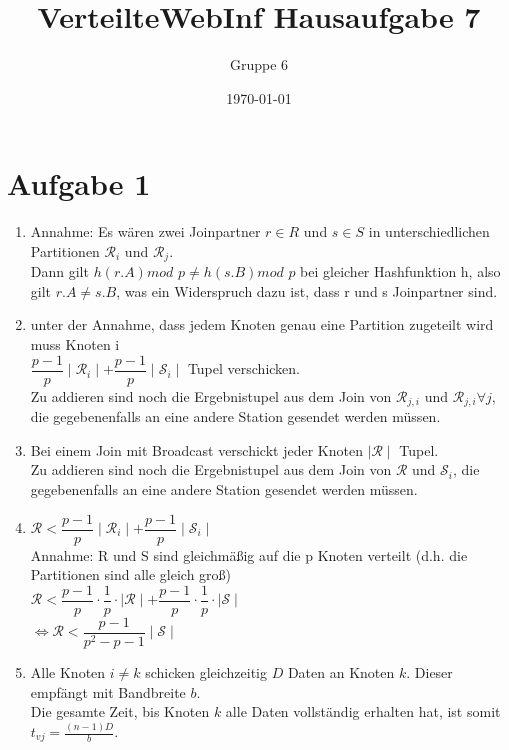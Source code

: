 \documentclass[a4paper]{article}
\author{Gruppe 6}
\title{\textbf{VerteilteWebInf Hausaufgabe 7}}
\date{\today}
\begin{document}
\maketitle


\section*{Aufgabe 1}
\begin{enumerate}[label=\alph*)]
\item Annahme: Es wären zwei Joinpartner $ r \in R $ und $ s \in S $ in unterschiedlichen Partitionen $ \mathcal{R}_i $ und $ \mathcal{R}_j $.\\
Dann gilt $ h(r.A) mod $  $p \neq h(s.B) mod $  $ p $ bei gleicher Hashfunktion h, also gilt $ r.A \neq s.B $, was ein Widerspruch dazu ist, dass r und s Joinpartner sind. 
\item unter der Annahme, dass jedem Knoten genau eine Partition zugeteilt wird muss Knoten i \\
$ \dfrac{p-1}{p} \mid \mathcal{R}_i \mid + \dfrac{p-1}{p} \mid \mathcal{S}_i \mid $ Tupel verschicken.\\
Zu addieren sind noch die Ergebnistupel aus dem Join von $ \mathcal{R}_{j,i} $ und $ \mathcal{R}_{j,i} \forall j$, die gegebenenfalls an eine andere Station gesendet werden müssen.
\item Bei einem Join mit Broadcast verschickt jeder Knoten $ \mid \mathcal{R} \mid $ Tupel.\\
Zu addieren sind noch die Ergebnistupel aus dem Join von $ \mathcal{R} $ und $ \mathcal{S}_{i} $, die gegebenenfalls an eine andere Station gesendet werden müssen.
\item $ \mathcal{R} < \dfrac{p-1}{p} \mid \mathcal{R}_i \mid + \dfrac{p-1}{p} \mid \mathcal{S}_i \mid $\\
Annahme: R und S sind gleichmäßig auf die p Knoten verteilt (d.h. die Partitionen sind alle gleich groß)\\
$ \mathcal{R} < \dfrac{p-1}{p} \cdot \dfrac{1}{p} \cdot \mid \mathcal{R} \mid + \dfrac{p-1}{p} \cdot \dfrac{1}{p} \cdot \mid \mathcal{S} \mid $\\
$ \Longleftrightarrow \mathcal{R} < \dfrac{p-1}{p^2-p-1} \mid \mathcal{S} \mid $
\item Alle Knoten $i\neq k$ schicken gleichzeitig $D$ Daten an Knoten $k$. Dieser empfängt mit Bandbreite $b$.\\
Die gesamte Zeit, bis Knoten $k$ alle Daten vollständig erhalten hat, ist somit $t_{vj} = \frac{(n-1)D}{b}$.

\end{enumerate}
\end{document}
